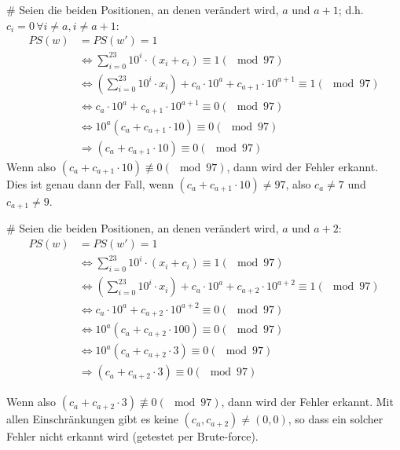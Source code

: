 \begin{myList}
#
Seien die beiden Positionen, an denen verändert wird, $a$ und $a+1$; d.h. $c_i=0\,\forall i\not= a, i\not=a+1$:
\begin{align*}
	PS(w) &= PS(w') = 1 \\
	 &\Leftrightarrow \sum_{i = 0}^{23} 10^i \cdot (x_i + c_i) \equiv 1 (\mod 97) \\
	  &\Leftrightarrow \left(\sum_{i = 0}^{23} 10^i \cdot x_i \right) + c_a \cdot 10^a + c_{a+1} \cdot 10^{a+1} \equiv 1 (\mod 97) \\
	  &\Leftrightarrow c_a \cdot 10^a + c_{a+1} \cdot 10^{a+1} \equiv 0 (\mod 97) \\
	  &\Leftrightarrow 10^a (c_a + c_{a+1} \cdot 10) \equiv 0 (\mod 97) \\
	  &\Rightarrow (c_a + c_{a+1} \cdot 10) \equiv 0 (\mod 97)
\end{align*}
Wenn also  $(c_a + c_{a+1} \cdot 10) \not\equiv 0 (\mod 97)$, dann wird der Fehler erkannt. Dies ist genau dann der Fall, wenn $(c_a + c_{a+1} \cdot 10) \not= 97$, also $c_a\not=7$ und $c_{a+1}\not=9$.

#
Seien die beiden Positionen, an denen verändert wird, $a$ und $a+2$:
\begin{align*}
	PS(w) &= PS(w') = 1 \\
	&\Leftrightarrow \sum_{i = 0}^{23} 10^i \cdot (x_i + c_i) \equiv 1 (\mod 97) \\
	&\Leftrightarrow \left(\sum_{i = 0}^{23} 10^i \cdot x_i \right) + c_a \cdot 10^a + c_{a+2} \cdot 10^{a+2} \equiv 1 (\mod 97) \\
	  &\Leftrightarrow c_a \cdot 10^a + c_{a+2} \cdot 10^{a+2} \equiv 0 (\mod 97) \\
	  &\Leftrightarrow 10^a (c_a + c_{a+2} \cdot 100) \equiv 0 (\mod 97) \\
	  &\Leftrightarrow 10^a (c_a + c_{a+2} \cdot 3) \equiv 0 (\mod 97) \\
	  &\Rightarrow (c_a + c_{a+2} \cdot 3) \equiv 0 (\mod 97)
\end{align*}

Wenn also $(c_a + c_{a+2} \cdot 3) \not\equiv 0 (\mod 97)$, dann wird der Fehler erkannt. Mit allen Einschränkungen gibt es keine $(c_a, c_{a+2})\not=(0, 0)$, so dass ein solcher Fehler nicht erkannt wird (getestet per Brute-force).


\end{myList}

